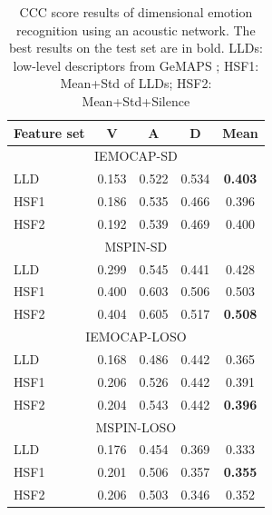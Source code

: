 \begin{table}[htpb]
\caption{CCC score results of dimensional emotion recognition using an acoustic
network. The best results on the test set are in bold. LLDs: low-level
descriptors from GeMAPS \cite{Eyben}; HSF1: Mean+Std of LLDs; HSF2: Mean+Std+Silence}
 \begin{center}
 \label{tab:ser-test}
 \begin{tabular}{l c c c c}
 \hline
Feature set & V & A & D & Mean \\
\hline \hline
\multicolumn{5}{c}{IEMOCAP-SD} \\
LLD    & 0.153 & 0.522 & 0.534 & \textbf{0.403} \\ 
HSF1   & 0.186 & 0.535 & 0.466 & 0.396 \\
HSF2   & 0.192 & 0.539 & 0.469 & 0.400 \\
 \hline
\multicolumn{5}{c}{MSPIN-SD} \\ 
LLD    & 0.299 & 0.545 & 0.441 & 0.428 \\
HSF1    & 0.400 & 0.603 & 0.506 & 0.503 \\
HSF2    & 0.404 & 0.605 & 0.517 & \textbf{0.508} \\
 \hline
\multicolumn{5}{c}{IEMOCAP-LOSO} \\
LLD    & 0.168 & 0.486 & 0.442 & 0.365 \\
HSF1   & 0.206 & 0.526 & 0.442 & 0.391 \\
HSF2   & 0.204 & 0.543 & 0.442 & \textbf{0.396} \\ 
 \hline
\multicolumn{5}{c}{MSPIN-LOSO} \\
LLD     & 0.176 & 0.454 & 0.369 & 0.333 \\ 
HSF1    & 0.201 & 0.506 & 0.357 & \textbf{0.355} \\
HSF2    & 0.206 & 0.503 & 0.346 & 0.352 \\
 \hline
 \end{tabular}
\end{center}
\end{table} 

